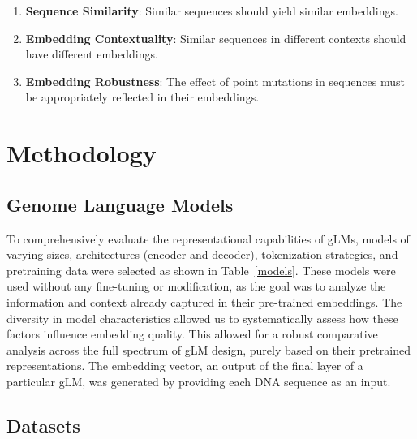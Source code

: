 \documentclass{ifacconf}
\begin{document}
\begin{enumerate}
    \vspace{0.2cm}
    \item \textbf{Sequence Similarity}: Similar sequences should yield similar embeddings. 
    \item \textbf{Embedding Contextuality}: Similar sequences in different contexts should have different embeddings.
    \item \textbf{Embedding Robustness}: The effect of point mutations in sequences must be appropriately reflected in their embeddings.
\end{enumerate}

\section{Methodology}

\subsection{Genome Language Models}
To comprehensively evaluate the representational capabilities of gLMs, models of varying sizes, architectures (encoder and decoder), tokenization strategies, and pretraining data were selected as shown in Table~\ref{models}.  These models were used without any fine-tuning or modification, as the goal was to analyze the information and context already captured in their pre-trained embeddings. The diversity in model characteristics allowed us to systematically assess how these factors influence embedding quality. This allowed for a robust comparative analysis across the full spectrum of gLM design, purely based on their pretrained representations. The embedding vector, an output of the final layer of a particular gLM, was generated by providing each DNA sequence as an input.

\subsection{Datasets}
\end{document}
